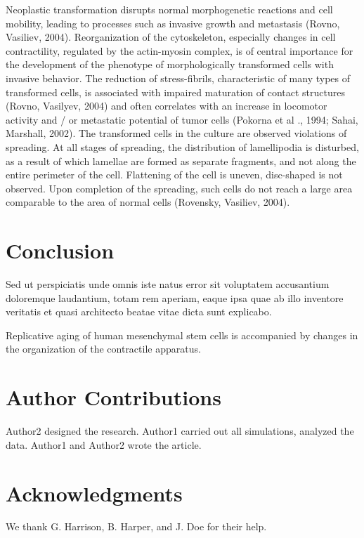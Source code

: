 \documentclass[english,authoryear]{elsarticle}
\begin{document}
Neoplastic transformation disrupts normal morphogenetic reactions and cell mobility, leading to processes such as invasive growth and metastasis (Rovno, Vasiliev, 2004). Reorganization of the cytoskeleton, especially changes in cell contractility, regulated by the actin-myosin complex, is of central importance for the development of the phenotype of morphologically transformed cells with invasive behavior. The reduction of stress-fibrils, characteristic of many types of transformed cells, is associated with impaired maturation of contact structures (Rovno, Vasilyev, 2004) and often correlates with an increase in locomotor activity and / or metastatic potential of tumor cells (Pokorna et al ., 1994; Sahai, Marshall, 2002). The transformed cells in the culture are observed violations of spreading. At all stages of spreading, the distribution of lamellipodia is disturbed, as a result of which lamellae are formed as separate fragments, and not along the entire perimeter of the cell. Flattening of the cell is uneven, disc-shaped is not observed. Upon completion of the spreading, such cells do not reach a large area comparable to the area of normal cells (Rovensky, Vasiliev, 2004).

\cite{vicente2009non}




\section*{Conclusion}

Sed ut perspiciatis unde omnis iste natus error sit voluptatem accusantium doloremque laudantium, totam rem aperiam, eaque ipsa quae ab illo inventore veritatis et quasi architecto beatae vitae dicta sunt explicabo.

Replicative aging of human mesenchymal stem cells is accompanied by changes in the organization of the contractile apparatus.

\section*{Author Contributions}

Author2 designed the research. Author1 carried out all simulations, analyzed the data. Author1 and Author2 wrote the article.

\section*{Acknowledgments}

We thank G. Harrison, B. Harper, and J. Doe for their help.

%

% 
% 
\end{document}
